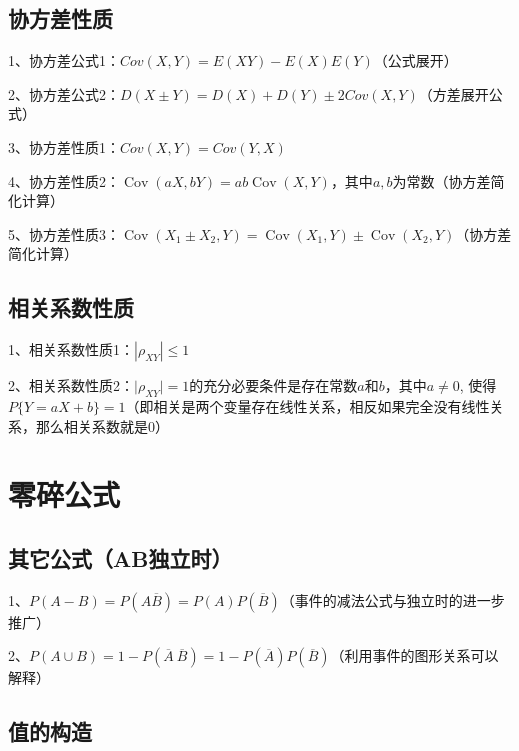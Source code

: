 \subsection{协方差性质}

1、协方差公式1：$C o v ( X , Y ) = E ( X Y ) - E ( X ) E ( Y ) $（公式展开）

2、协方差公式2：$D ( X \pm Y ) = D ( X ) + D ( Y ) \pm 2 Cov ( X , Y )  $（方差展开公式）

3、协方差性质1：$Cov(X, Y)=Cov(Y, X)$

4、协方差性质2：$\operatorname{Cov}(a X, b Y)=a b \operatorname{Cov}(X, Y)$，其中$a,b$为常数（协方差简化计算）

5、协方差性质3：$\operatorname{Cov}\left(X_{1}\pm X_{2}, Y\right)=\operatorname{Cov}\left(X_{1}, Y\right)\pm \operatorname{Cov}\left(X_{2}, Y\right)$（协方差简化计算）



\subsection{相关系数性质}

1、相关系数性质1：$\left|\rho_{X Y}\right| \leqslant 1$

2、相关系数性质2：$\mid \rho_{X Y} \mid=1$的充分必要条件是存在常数$a$和$b$，其中$a \neq 0$, 使得$P\{Y=a X+b\}=1$（即相关是两个变量存在线性关系，相反如果完全没有线性关系，那么相关系数就是0）

\section{零碎公式}



\subsection{其它公式（AB独立时）}

1、$P(A-B) = P(A\overline B)=P(A)P(\overline B)$（事件的减法公式与独立时的进一步推广）

2、$P(A\cup B) = 1-P(\overline A \  \overline B) = 1-P(\overline A)P(  \overline B)$（利用事件的图形关系可以解释）



\subsection{值的构造}

